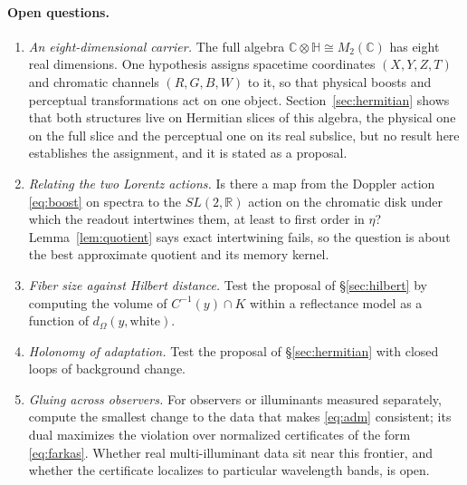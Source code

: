 \documentclass[11pt]{article}
\theoremstyle{boldplain}
\theoremstyle{boldupright}
\newcommand{\proposed}{[\textup{\textsc{Proposed}}]}
\begin{document}
\paragraph{Open questions.}
\begin{enumerate}[leftmargin=*]
\item \proposed{} \emph{An eight-dimensional carrier.} The full algebra $\mathbb{C}\otimes\mathbb{H}\cong M_2(\mathbb{C})$ has eight real
dimensions. One hypothesis assigns spacetime coordinates $(X,Y,Z,T)$ and chromatic channels
$(R,G,B,W)$ to it, so that physical boosts and perceptual transformations act on one object.
Section~\ref{sec:hermitian} shows that both structures live on Hermitian slices of this algebra, the physical one
on the full slice and the perceptual one on its real subslice, but no result here establishes the
assignment, and it is stated as a proposal.

\item \emph{Relating the two Lorentz actions.} Is there a map from the Doppler action \eqref{eq:boost} on spectra to
the $SL(2,\mathbb{R})$ action on the chromatic disk under which the readout intertwines them, at least
to first order in $\eta$? Lemma~\ref{lem:quotient} says exact intertwining fails, so the question is about the best
approximate quotient and its memory kernel.

\item \emph{Fiber size against Hilbert distance.} Test the proposal of \S\ref{sec:hilbert} by computing the volume of
$C^{-1}(y)\cap K$ within a reflectance model as a function of $d_\Omega(y,\text{white})$.

\item \emph{Holonomy of adaptation.} Test the proposal of \S\ref{sec:hermitian} with closed loops of background change.

\item \emph{Gluing across observers.} For observers or illuminants measured separately, compute the smallest
change to the data that makes \eqref{eq:adm} consistent; its dual maximizes the violation over normalized
certificates of the form \eqref{eq:farkas}. Whether real multi-illuminant data sit near this frontier, and whether
the certificate localizes to particular wavelength bands, is open.


\end{enumerate}
\end{document}
